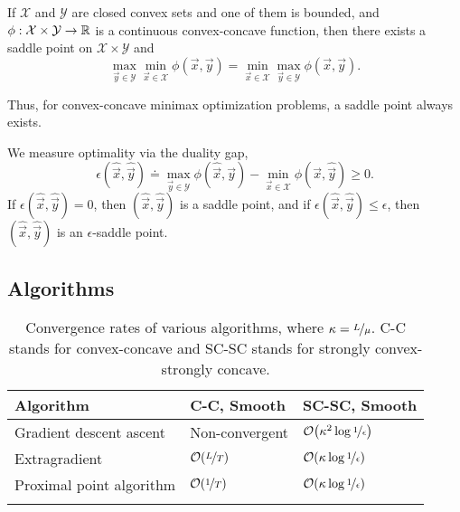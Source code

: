 \begin{theorem}
    If $\mathcal{X}$ and $\mathcal{Y}$ are closed convex sets and one of them is bounded, and $\phi: \mathcal{X} \times \mathcal{Y} \to \mathbb{R}$ is a continuous convex-concave function, then there exists a saddle point on $\mathcal{X} \times \mathcal{Y}$ and \[
        \max_{\vec{y} \in \mathcal{Y}} \min_{\vec{x} \in \mathcal{X}} \phi(\vec{x}, \vec{y}) = \min_{\vec{x} \in \mathcal{X}} \max_{\vec{y} \in \mathcal{Y}} \phi(\vec{x}, \vec{y}).
    \]
\end{theorem}

Thus, for convex-concave minimax optimization problems, a saddle point always exists.

We measure optimality via the duality gap, \[
    \epsilon(\hat{\vec{x}}, \hat{\vec{y}}) \doteq \max_{\vec{y} \in \mathcal{Y}} \phi(\hat{\vec{x}}, \vec{y}) - \min_{\vec{x} \in \mathcal{X}} \phi(\vec{x}, \hat{\vec{y}}) \geq 0.
\]
If $\epsilon(\hat{\vec{x}}, \hat{\vec{y}}) = 0$, then $(\hat{\vec{x}}, \hat{\vec{y}})$ is a saddle
point, and if $\epsilon(\hat{\vec{x}}, \hat{\vec{y}}) \leq \epsilon$, then $(\hat{\vec{x}},
    \hat{\vec{y}})$ is an $\epsilon$-saddle point.

\subsection{Algorithms}

\begin{table}[t]
    \centering
    \caption{Convergence rates of various algorithms, where $\kappa = \nicefrac{L}{\mu}$. C-C stands for convex-concave and SC-SC stands for strongly convex-strongly concave.}
    \label{tab:mmo}
    \begin{tabular}{lll} \toprule
        \textbf{Algorithm}       & \textbf{C-C, Smooth}     & \textbf{SC-SC, Smooth}                        \\
        \midrule
        Gradient descent ascent  & Non-convergent           & $\bigo{\kappa^2 \log \nicefrac{1}{\epsilon}}$ \\
        Extragradient            & $\bigo{\nicefrac{L}{T}}$ & $\bigo{\kappa \log \nicefrac{1}{\epsilon}}$   \\
        Proximal point algorithm & $\bigo{\nicefrac{1}{T}}$ & $\bigo{\kappa \log \nicefrac{1}{\epsilon}}$   \\
        \bottomrule                                                                                         \\
    \end{tabular}
\end{table}

